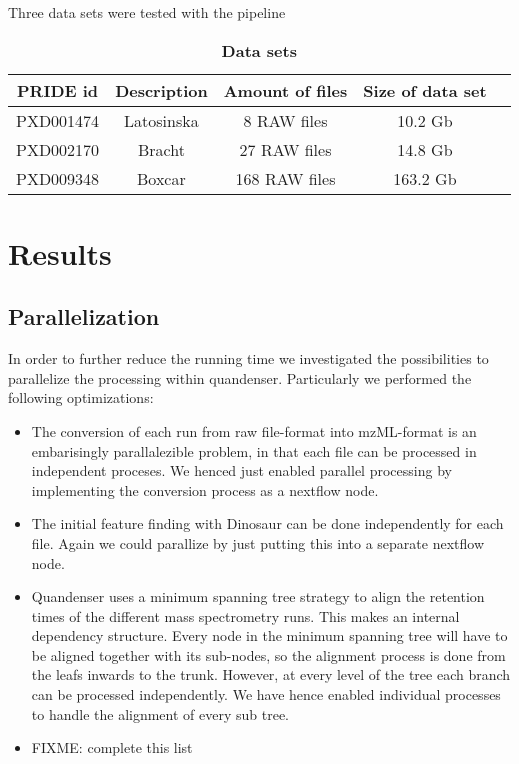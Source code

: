 \documentclass[11pt]{article}
\begin{document}
Three data sets were tested with the pipeline

\begin{table}[!h]
  \caption{{\textbf{Data sets}}}
  \label{table:datasets}
\begin{center}
\begin{tabular}{ccccc}
PRIDE id & Description & Amount of files & Size of data set \\ \hline \hline
PXD001474 & Latosinska & 8 RAW files & 10.2 Gb \\
PXD002170 & Bracht & 27 RAW files & 14.8 Gb  \\
PXD009348 & Boxcar & 168 RAW files & 163.2 Gb & \\
\end{tabular}
\end{center}
\end{table}

\section*{Results}

\subsection*{Parallelization}
In order to further reduce the running time we investigated the possibilities to parallelize the processing within quandenser. Particularly we performed the following optimizations:
\begin{itemize}
  \item The conversion of each run from raw file-format into mzML-format is an embarisingly parallalezible problem, in that each file can be processed in independent proceses. We henced just enabled parallel processing by implementing the conversion process as a nextflow node.
  \item The initial feature finding with Dinosaur\cite{teleman2016dinosaur} can be done independently for each file. Again we could parallize by just putting this into a separate nextflow node.
  \item Quandenser uses a minimum spanning tree strategy \cite{rost2016tric} to align the retention times of the different mass spectrometry runs. This makes an internal dependency structure. Every node in the minimum spanning tree will have to be aligned together with its sub-nodes, so the alignment process is done from the leafs inwards to the trunk.  However, at every level of the tree each branch can be processed independently. We have hence enabled individual processes to handle the alignment of every sub tree.
  \item FIXME: complete this list
\end{itemize}
\end{document}
